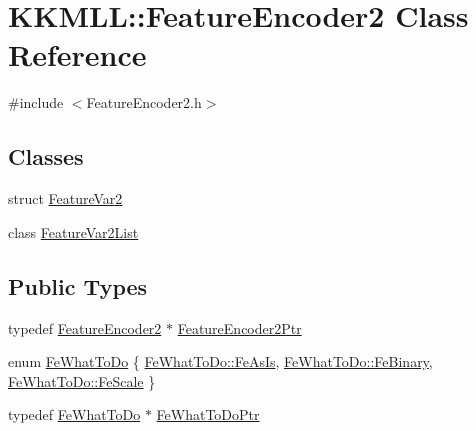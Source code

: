 \hypertarget{class_k_k_m_l_l_1_1_feature_encoder2}{}\section{K\+K\+M\+LL\+:\+:Feature\+Encoder2 Class Reference}
\label{class_k_k_m_l_l_1_1_feature_encoder2}


{\ttfamily \#include $<$Feature\+Encoder2.\+h$>$}

\subsection*{Classes}
\begin{DoxyCompactItemize}
\item 
struct \hyperlink{struct_feature_encoder2_1_1_feature_var2}{Feature\+Var2}
\item 
class \hyperlink{class_feature_encoder2_1_1_feature_var2_list}{Feature\+Var2\+List}
\end{DoxyCompactItemize}
\subsection*{Public Types}
\begin{DoxyCompactItemize}
\item 
typedef \hyperlink{class_k_k_m_l_l_1_1_feature_encoder2}{Feature\+Encoder2} $\ast$ \hyperlink{class_k_k_m_l_l_1_1_feature_encoder2_a532ca948bcdc2c2bf3ccbce7f323a8a9}{Feature\+Encoder2\+Ptr}
\item 
enum \hyperlink{class_k_k_m_l_l_1_1_feature_encoder2_a590f2b852b63095e7347e4cb39d888a7}{Fe\+What\+To\+Do} \{ \hyperlink{class_k_k_m_l_l_1_1_feature_encoder2_a590f2b852b63095e7347e4cb39d888a7a8fdde05abb9506fd4caa93ddc4490a13}{Fe\+What\+To\+Do\+::\+Fe\+As\+Is}, 
\hyperlink{class_k_k_m_l_l_1_1_feature_encoder2_a590f2b852b63095e7347e4cb39d888a7ab88633cd9a2d1569dc1979a5e5cb1752}{Fe\+What\+To\+Do\+::\+Fe\+Binary}, 
\hyperlink{class_k_k_m_l_l_1_1_feature_encoder2_a590f2b852b63095e7347e4cb39d888a7aa6a59adc4c0770972e52a9c13d0720f3}{Fe\+What\+To\+Do\+::\+Fe\+Scale}
 \}
\item 
typedef \hyperlink{class_k_k_m_l_l_1_1_feature_encoder2_a590f2b852b63095e7347e4cb39d888a7}{Fe\+What\+To\+Do} $\ast$ \hyperlink{class_k_k_m_l_l_1_1_feature_encoder2_a0d93f1765b83a213a2269185fc66bf97}{Fe\+What\+To\+Do\+Ptr}
\end{DoxyCompactItemize}
